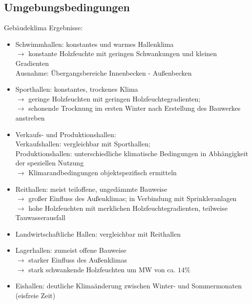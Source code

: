 \documentclass[fleqn,twoside]{article}
\begin{document}
    \subsection{Umgebungsbedingungen}
        Gebäudeklima Ergebnisse:
                \begin{itemize}
                    \item Schwimmhallen: konstantes und warmes Hallenklima\\
                        $\rightarrow$ konstante Holzfeuchte mit geringen Schwankungen und kleinen Gradienten \\
                        Ausnahme: Übergangsbereiche Innenbecken - Außenbecken
                    \item Sporthallen: konstantes, trockenes Klima\\
                        $\rightarrow$ geringe Holzfeuchten mit geringen Holzfeuchtegradienten;\\
                        $\rightarrow$ schonende Trocknung im ersten Winter nach Erstellung des Bauwerkes anstreben
                    \item Verkaufs- und Produktionshallen:\\
                        Verkaufshallen: vergleichbar mit Sporthallen;\\
                        Produktionshallen: unterschiedliche klimatische Bedingungen in Abhängigkeit der speziellen Nutzung\\
                        $\rightarrow$ Klimarandbedingungen objektspezifisch ermitteln
                    \item Reithallen: meist teiloffene, ungedämmte Bauweise\\
                        $\rightarrow$ großer Einfluss des Außenklimas; in Verbindung mit Sprinkleranlagen\\
                        $\rightarrow$ hohe Holzfeuchten mit merklichen Holzfeuchtegradienten, teilweise Tauwasserausfall
                    \item Landwirtschaftliche Hallen: vergleichbar mit Reithallen
                    \item Lagerhallen: zumeist offene Bauweise\\
                        $\rightarrow$ starker Einfluss des Außenklimas\\
                        $\rightarrow$ stark schwankende Holzfeuchten um MW von ca. $14 \%$
                    \item Eishallen: deutliche Klimaänderung zwischen Winter- und Sommermonaten (eisfreie Zeit)\\

\end{itemize}
\end{document}
